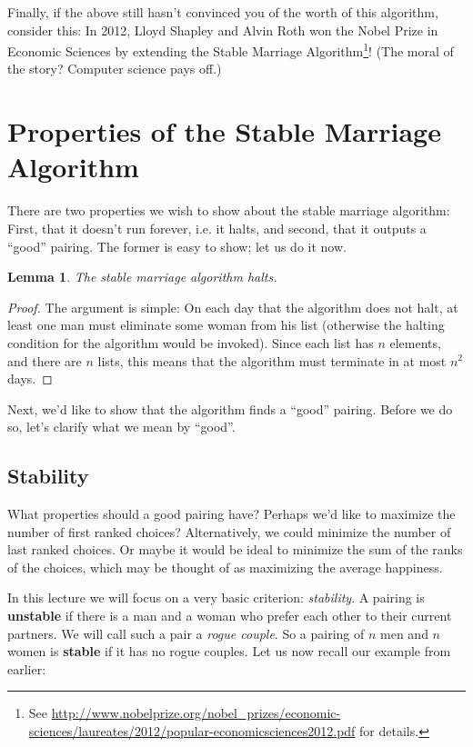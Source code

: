 \documentclass[11pt,fleqn]{article}
\newcounter{thm}
\newtheorem{lemma}{Lemma}[thm]
\begin{document}
Finally, if the above still hasn't convinced you of the worth of this algorithm, consider this: In 2012, Lloyd Shapley and Alvin Roth won the Nobel Prize in
Economic Sciences by extending the Stable Marriage Algorithm\footnote{See \url{http://www.nobelprize.org/nobel_prizes/economic-sciences/laureates/2012/popular-economicsciences2012.pdf}
for details.}! (The moral of the story? Computer science pays off.)

\section{Properties of the Stable Marriage Algorithm}\label{scn:properties}

There are two properties we wish to show about the stable marriage algorithm: First, that it doesn't run forever, i.e. it halts, and second, that it outputs a ``good'' pairing. The former is easy to show; let us do it now.

\begin{lemma}\label{l:halts}
    The stable marriage algorithm halts.
\end{lemma}
\begin{proof}
    The argument is simple: On each day that the algorithm does not halt, at least one man must eliminate some woman from his list (otherwise the halting condition for the algorithm would be invoked). Since each list has $n$ elements, and there are $n$ lists, this means that the algorithm must terminate in at most $n^2$ days.
\end{proof}

Next, we'd like to show that the algorithm finds a ``good'' pairing. Before we do so, let's clarify what we mean by ``good''.

\subsection{Stability}\label{sscn:stability}
What properties should a good pairing have? Perhaps we'd like to maximize the number of
first ranked choices? Alternatively, we could minimize the number of last ranked choices. Or maybe it would be ideal to minimize the sum of the ranks of the choices, which may be thought of as maximizing the average happiness.

In this lecture we will focus on a very basic criterion:
\emph{stability}. A pairing is \textbf{unstable} if there is a man and a woman
who prefer each other to their current partners. We will call such a
pair a {\it rogue couple}. So a
pairing of $n$ men and $n$ women is \textbf{stable} if it has no rogue couples. Let us now recall our example from earlier:
\end{document}
